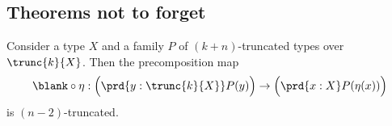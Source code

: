 \begin{comment}
\begin{proof}
We have to show that $\fib{f}{x}$ is $\susp(M)$-connected for each $x:X$. 
Since this is a mere proposition, and we assume that $f$ is surjective, it
is equivalent to show that $\fib{f}{f(a)}$ is $\susp(M)$-connected for each $a:A$. 
Let $Y$ be a $\susp(M)$-null type. 
For every $g:\fib{f}{f(a)}\to Y$ be a map we have the point $\theta(g)\defeq g(a,\refl{f(a)})$ in $Y$,
so we obtain a map
\begin{equation*}
\theta : (\fib{f}{f(a)}\to Y)\to Y
\end{equation*}
It is clear that $\theta(\lam{\pairr{b,p}}y)=y$, so it remains to show that
for every $g:\fib{f}{f(a)}\to Y$ we have $\lam{\pairr{b,p}}\theta(g)=g$.
That is, we must show that
\begin{equation*}
\prd{b:A}{p:f(a)=f(b)} g(a,\refl{f(a)})=g(b,p).
\end{equation*}
Using the assumption that $Y$ is $\susp(M)$-connected, it follows from
\cref{lem:local_id} that the type $g(a,\refl{f(a)})=g(b,p)$ is $M$-connected,
for every $b:A$ and $p:f(a)=f(b)$.
Therefore it follows, since the map $\mapfunc{f}(a,b):(a=b)\to(f(a)=f(b))$ is connected, that our goal is equivalent to
\begin{equation*}
\prd{b:A}{p:a=b} g(a,\refl{f(a)})=g(b,\mapfunc{f}(a,b,p)).
\end{equation*}
This follows by path induction. 
\end{proof}
\end{comment}

\subsection{Theorems not to forget}

\begin{thm}
  Consider a type $X$ and a family $P$ of $(k+n)$-truncated types over $\trunc{k}{X}$. Then the precomposition map
  \begin{equation*}
    \blank\circ\eta : \Big(\prd{y:\trunc{k}{X}}P(y)\Big)\to\Big(\prd{x:X}P(\eta(x))\Big)
  \end{equation*}
  is $(n-2)$-truncated.
\end{thm}

